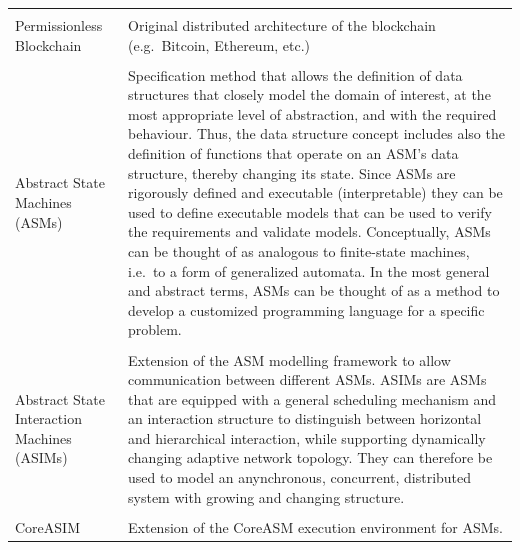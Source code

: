 {\begin{longtable}[]{@{}ll@{}}
\tabularnewline\tabularnewline
\begin{minipage}[t]{0.2\columnwidth}\raggedright\strut
Permissionless Blockchain
\strut
\end{minipage} & \begin{minipage}[t]{0.77\columnwidth}\raggedright\strut
Original distributed architecture of the blockchain (e.g.\ Bitcoin, Ethereum, etc.)
\strut
\end{minipage}

\tabularnewline\tabularnewline
\begin{minipage}[t]{0.2\columnwidth}\raggedright\strut
Abstract State Machines (ASMs)
\strut
\end{minipage} & \begin{minipage}[t]{0.77\columnwidth}\raggedright\strut
Specification method that allows the definition of data structures that closely model the domain of interest, at the most appropriate level of abstraction, and with the required behaviour. Thus, the data structure concept includes also the definition of functions that operate on an ASM's data structure, thereby changing its state. Since ASMs are rigorously defined and executable (interpretable) they can be used to define executable models that can be used to verify the requirements and validate models. Conceptually, ASMs can be thought of as analogous to finite-state machines, i.e.\ to a form of generalized automata. In the most general and abstract terms, ASMs can be thought of as a method to develop a customized programming language for a specific problem.
\strut
\end{minipage}

\tabularnewline\tabularnewline
\begin{minipage}[t]{0.2\columnwidth}\raggedright\strut
Abstract State Interaction Machines (ASIMs)
\strut
\end{minipage} & \begin{minipage}[t]{0.77\columnwidth}\raggedright\strut
Extension of the ASM modelling framework to allow communication between different ASMs. ASIMs are ASMs that are equipped with a general scheduling mechanism and an interaction structure to distinguish between horizontal and hierarchical interaction, while supporting dynamically changing adaptive network topology. They can therefore be used to model an anynchronous, concurrent, distributed system with growing and changing structure.
\strut
\end{minipage}

\tabularnewline\tabularnewline
\begin{minipage}[t]{0.2\columnwidth}\raggedright\strut
CoreASIM
\strut
\end{minipage} & \begin{minipage}[t]{0.77\columnwidth}\raggedright\strut
Extension of the CoreASM execution environment for ASMs.
\strut
\end{minipage}


\end{longtable}}
